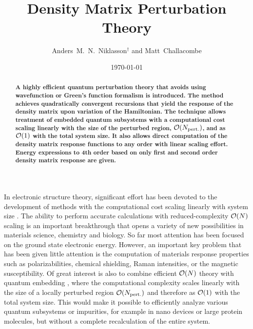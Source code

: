 
\draft
\tighten



\title{Density Matrix Perturbation Theory}

\author{Anders~M.~N.~Niklasson$^\dagger$  and Matt~Challacombe}

\address{Theoretical Division, Los Alamos National Laboratory,
Los Alamos, NM 87545, USA}

\date{\today}
\maketitle


\begin{abstract}
{\small \bf A highly efficient quantum perturbation theory 
that avoids using wavefunction or Green's function formalism is introduced.
The method achieves quadratically convergent recursions that yield
the response of the density matrix upon variation of the Hamiltonian. 
The technique allows treatment of embedded quantum subsystems with a 
computational cost scaling linearly with the size of the perturbed 
region, ${\cal O}(N_{\rm pert.})$, and as ${\cal O}(1)$ with the total 
system size. It also allows direct computation of the density matrix response 
functions to any order with linear scaling effort.  Energy expressions to 
4th order based on only first and second order density matrix response are given.}
\\

\end{abstract}

In electronic structure 
theory, significant effort has been devoted to the development of
methods with the computational cost scaling linearly with system size 
\cite{Goedecker_RMP_99,Wu02}. The ability to perform accurate calculations
with reduced-complexity ${\cal O}(N)$ scaling is an important breakthrough 
that opens a variety of new possibilities in materials science, 
chemistry and biology. So far most attention has been focused on 
the ground state electronic energy. However, an important key problem
that has been given little attention is the computation of materials 
response properties such as polarizabilities, chemical shielding, Raman 
intensities, or the magnetic susceptibility.
Of great interest is also to combine efficient ${\cal O}(N)$ theory with 
quantum embedding \cite{Pantelides78,Haydock80,Inglesfield81}, where the computational 
complexity scales linearly with the size of a locally perturbed region
${\cal O}(N_{\rm pert.})$ and therefore as ${\cal O}(1)$ with the total 
system size. This would make it possible to efficiently analyze various
quantum subsystems or impurities, for example in nano devices or large 
protein molecules, but without a complete recalculation 
of the entire system. 

